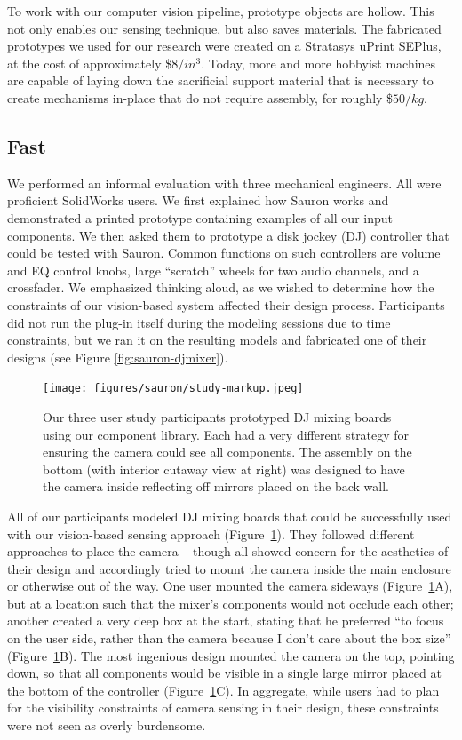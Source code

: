     To work with our computer vision pipeline, prototype objects are hollow. This not only enables our sensing technique, but also saves materials. The fabricated prototypes we used for our research were created on a Stratasys uPrint SEPlus, at the cost of approximately \$$8/in^3$. Today, more and more hobbyist machines are capable of laying down the sacrificial support material that is necessary to create mechanisms in-place that do not require assembly, for roughly \$$50/kg$.
    
    \subsection{Fast}
    
    We performed an informal evaluation with three mechanical engineers. All were proficient SolidWorks users. We first explained how Sauron works and demonstrated a printed prototype containing examples of all our input components. We then asked them to prototype a disk jockey (DJ) controller that could be tested with Sauron. Common functions on such controllers are volume and EQ control knobs, large ``scratch'' wheels for two audio channels, and a crossfader. We emphasized thinking aloud, as we wished to determine how the constraints of our vision-based system affected their design process. Participants did not run the plug-in itself during the modeling sessions due to time constraints, but we ran it on the resulting models and fabricated one of their designs (see Figure \ref{fig:sauron-djmixer}).
    
    \begin{figure}
\centering
\texttt{[image: figures/sauron/study-markup.jpeg]}
\caption{Our three user study participants prototyped DJ mixing boards using our component library. Each had a very different strategy for ensuring the camera could see all components. The assembly on the bottom (with interior cutaway view at right) was designed to have the camera inside reflecting off mirrors placed on the back wall.}
\label{fig:sauron-study}
\end{figure}

    All of our participants modeled DJ mixing boards that could be successfully used with our vision-based sensing approach (Figure~\ref{fig:sauron-study}). They followed different approaches to place the camera -- though all showed concern for the aesthetics of their design and accordingly tried to mount the camera inside the main enclosure or otherwise out of the way. One user mounted the camera sideways (Figure~\ref{fig:sauron-study}A), but at a location such that the mixer's components would not occlude each other; another created a very deep box at the start, stating that he preferred ``to focus on the user side, rather than the camera because I don't care about the box size'' (Figure~\ref{fig:sauron-study}B). The most ingenious design mounted the camera on the top, pointing down, so that all components would be visible in a single large mirror placed at the bottom of the controller (Figure~\ref{fig:sauron-study}C). In aggregate, while users had to plan for the visibility constraints of camera sensing in their design, these constraints were not seen as overly burdensome.

